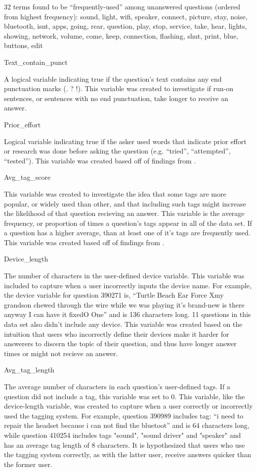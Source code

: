 \documentclass{article}
\begin{document}
32 terms found to be ``frequently-used'' among unanswered questions (ordered from highest frequency):
sound, light, wifi, speaker, connect, picture, stay, noise, bluetooth, isnt, apps, going, rear, question, play, stop, service, take, hear, lights, showing, network, volume, come, keep, connection, flashing, shut, print, blue, buttons, edit
  
Text\_contain\_punct

A logical variable indicating true if the question’s text contains any end punctuation marks (. ? !). This variable was created to investigate if run-on sentences, or sentences with no end punctuation, take longer to receive an answer. 

Prior\_effort 

Logical variable indicating true if the asker used words that indicate prior effort or research was done before asking the question (e.g. ``tried'', ``attempted'', ``tested''). This variable was created based off of findings from \cite{Bhat2014}. 

Avg\_tag\_score

This variable was created to investigate the idea that some tags are more popular, or widely used than other, and that including such tags might increase the likelihood of that question recieving an answer. This variable is the average frequency, or proportion of times a question's tags appear in all of the data set. If a question has a higher average, than at least one of it's tags are frequently used. This variable was created based off of findings from \cite{Bhat2014}. 

Device\_length

The number of characters in the user-defined device variable. This variable was included to capture when a user incorrectly inputs the device name. For example, the device variable for question 390271 is, “Turtle Beach Ear Force Xmy grandson chewed through the wire while we was playing it's brand-new is there anyway I can have it fixedO One” and is 136 characters long. 11 questions in this data set also didn’t include any device. This variable was created based on the intuition that users who incorrectly define their devices make it harder for answerers to discern the topic of their question, and thus have longer answer times or might not recieve an answer.

Avg\_tag\_length

The average number of characters in each question's user-defined tags. If a question did not include a tag, this variable was set to 0. This variable, like the device-length variable, was created to capture when a user correctly or incorrectly used the tagging system. For example, question 390989 includes tag: “i need to repair the headset because i can not find the bluetoot” and is 64 characters long, while question 410254 includes tags "sound", "sound driver" and "speaker" and has an average tag length of 8 characters. It is hypothesized that users who use the tagging system correctly, as with the latter user, receive answers quicker than the former user. 
\end{document}
